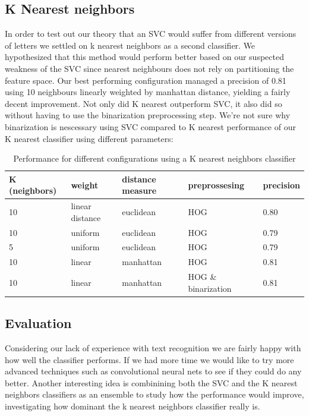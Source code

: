 \documentclass[paper=a4, fontsize=11pt]{scrartcl} %
\numberwithin{equation}{section} %
\numberwithin{figure}{section} %
\numberwithin{table}{section} %
\begin{document}
\subsection{K Nearest neighbors}
In order to test out our theory that an SVC would suffer from
different versions of letters we settled on k nearest neighbors as a
second classifier.  We hypothesized that this method would perform
better based on our suspected weakness of the SVC since nearest
neighbours does not rely on partitioning the feature space.  Our best
performing configuration managed a precision of 0.81 using 10
neighbours linearly weighted by manhattan distance, yielding a fairly
decent improvement.  Not only did K nearest outperform SVC, it also
did so without having to use the binarization preprocessing step.
We're not sure why binarization is nescessary using SVC compared to K
nearest %
performance of our K nearest classifier using different parameters:
\begin{table}[H]
    \centering
    \begin{tabular}{l | l | l | l | l}
        K (neighbors) & weight & distance measure & preprossesing & precision\\ \hline
        10 & linear distance & euclidean & HOG & 0.80\\ \hline
        10 & uniform & euclidean & HOG & 0.79\\ \hline
        5 & uniform & euclidean & HOG & 0.79\\ \hline
        10 & linear & manhattan & HOG & 0.81\\ \hline
        10 & linear & manhattan & HOG \& binarization & 0.81\\
    \end{tabular}
    \caption{Performance for different configurations using a K nearest neighbors classifier}
\end{table}
\subsection{Evaluation}
Considering our lack of experience with text recognition we are fairly happy with how well the classifier performs.
If we had more time we would like to try more advanced techniques such as convolutional neural nets to see if they could do any better.
Another interesting idea is combinining both the SVC and the K nearest neighbors classifiers as an ensemble to study how the performance would improve, 
investigating how dominant the k nearest neighbors classifier really is.
\end{document}
